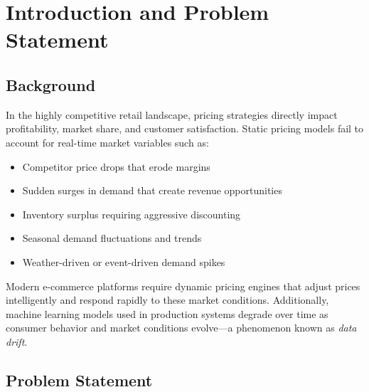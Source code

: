 \documentclass[12pt,a4paper]{report}
\begin{document}
\chapter{Introduction and Problem Statement}

\section{Background}

In the highly competitive retail landscape, pricing strategies directly impact profitability, market share, and customer satisfaction. Static pricing models fail to account for real-time market variables such as:

\begin{itemize}[leftmargin=2em]
    \item Competitor price drops that erode margins
    \item Sudden surges in demand that create revenue opportunities
    \item Inventory surplus requiring aggressive discounting
    \item Seasonal demand fluctuations and trends
    \item Weather-driven or event-driven demand spikes
\end{itemize}

Modern e-commerce platforms require dynamic pricing engines that adjust prices intelligently and respond rapidly to these market conditions. Additionally, machine learning models used in production systems degrade over time as consumer behavior and market conditions evolve---a phenomenon known as \textit{data drift}.

\section{Problem Statement}
\end{document}
